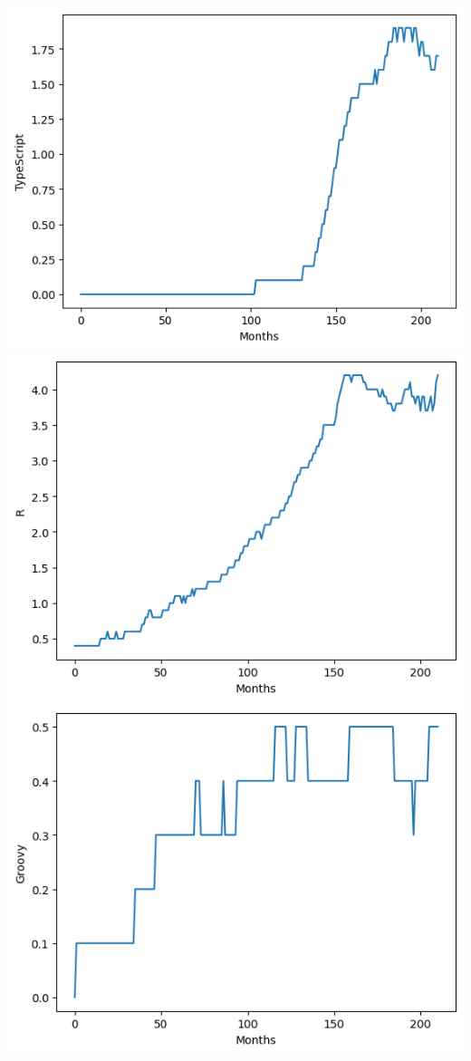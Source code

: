 \documentclass[conference]{IEEEtran}
\begin{document}
\includegraphics[scale=0.4]{lineplot/typescript.png}
\includegraphics[scale=0.4]{lineplot/r.png}
\includegraphics[scale=0.4]{lineplot/groovy.png}
\end{document}
